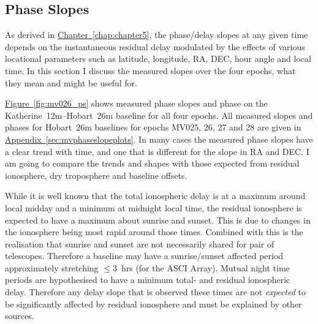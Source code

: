 	
	\clearpage
	\subsection{Phase Slopes} \label{sec:phaseslopes}
		As derived in \hyperref[chap:chapter5]{Chapter~\ref*{chap:chapter5}}, the phase/delay slopes at any given time depends on the instantaneous residual delay modulated by the effects of various locational parameters such as latitude, longitude, RA, DEC, hour angle and local time. In this section I discuss the measured slopes over the four epochs, what they mean and might be useful for.
		
		\hyperref[fig:mv026_ps]{Figure~\ref*{fig:mv026_ps}} shows measured phase slopes and phase on the Katherine~12m--Hobart~26m baseline for all four epochs. All measured slopes and phases for Hobart~26m baselines for epochs MV025, 26, 27 and 28 are given in \hyperref[sec:mvphaseslopeplots]{Appendix~\ref*{sec:mvphaseslopeplots}}. In many cases the measured phase slopes have a clear trend with time, and one that is different for the slope in RA and DEC. I am going to compare the trends and shapes with those expected from residual ionosphere, dry troposphere and baseline offsets.
		
		While it is well known that the total ionospheric delay is at a maximum around local midday and a minimum at midnight local time, the residual ionosphere is expected to have a maximum about sunrise and sunset. This is due to changes in the ionosphere being most rapid around those times. Combined with this is the realisation that sunrise and sunset are not necessarily shared for pair of telescopes. Therefore a baseline may have a sunrise/sunset affected period approximately stretching $\le3$~hrs (for the ASCI Array). Mutual night time periods are hypothesised to have a minimum total- and residual ionospheric delay. Therefore any delay slope that is observed these times are not \textit{expected} to be significantly affected by residual ionosphere and must be explained by other sources.
		
